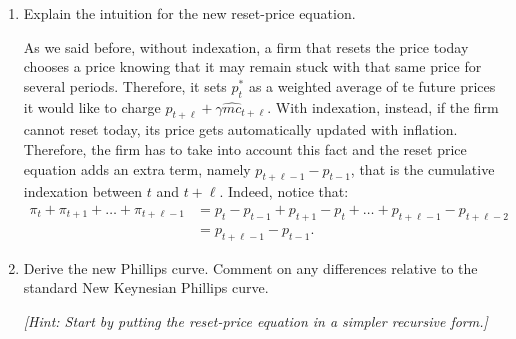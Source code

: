 \documentclass[dvipsnames,11pt]{article}
\begin{document}
    \begin{enumerate}[resume]

        \item Explain the intuition for the new reset-price equation.

            \begin{solution}
As we said before, without indexation, a firm that resets the price today chooses a  price knowing that it may remain stuck with that same price for several periods. Therefore, it sets $p_t^*$ as a weighted average of te future prices it would like to charge $p_{t+\ell}+\gamma \widehat{mc}_{t+\ell}$. With indexation, instead, if the firm cannot reset today, its price gets automatically updated with inflation. Therefore, the firm has to take into account this fact and the reset price equation adds an extra term, namely $p_{t+\ell-1}-p_{t-1}$, that is the cumulative indexation between $t$ and $t+\ell$. Indeed, notice that:
\begin{align*}
    \pi_t+ \pi_{t+1}+ \dots + \pi_{t+\ell-1}&= p_t-p_{t-1}+ p_{t+1}-p_t + \dots +p_{t+\ell-1}-p_{t+\ell-2} \\
    &= p_{t+\ell-1}-p_{t-1}.
\end{align*}
            
            
            \end{solution}

        \item Derive the new Phillips curve. Comment on any differences relative to the standard New Keynesian Phillips curve. 

            \textit{[Hint: Start by putting the reset-price equation in a simpler recursive form.]} 


\end{enumerate}
\end{document}
